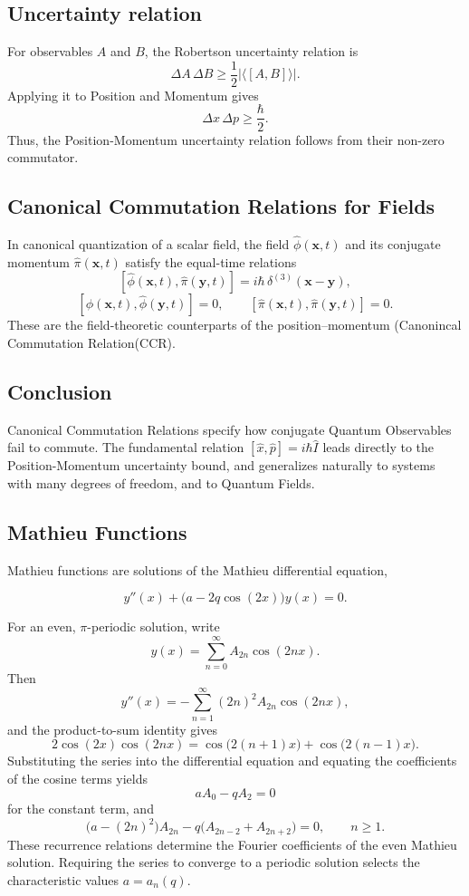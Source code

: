 \documentclass[a4paper, 10pt, onepage]{elegantbook}
\begin{document}
\subsection{Uncertainty relation}

For observables \(A\) and \(B\), the Robertson uncertainty relation is
\[
\Delta A\,\Delta B
\geq \frac{1}{2}\left|\langle[A,B]\rangle\right|.
\]
Applying it to Position and Momentum gives
\[
\Delta x\,\Delta p\geq\frac{\hbar}{2}.
\]
Thus, the Position-Momentum uncertainty relation follows from their non-zero commutator.

\subsection{Canonical Commutation Relations for Fields}

In canonical quantization of a scalar field, the field
\(\hat{\phi}(\mathbf{x},t)\) and its conjugate momentum
\(\hat{\pi}(\mathbf{x},t)\) satisfy the equal-time relations
\[
[\hat{\phi}(\mathbf{x},t),\hat{\pi}(\mathbf{y},t)]
=i\hbar\,\delta^{(3)}(\mathbf{x}-\mathbf{y}),
\]
\[
[\hat{\phi}(\mathbf{x},t),\hat{\phi}(\mathbf{y},t)]=0,
\qquad
[\hat{\pi}(\mathbf{x},t),\hat{\pi}(\mathbf{y},t)]=0.
\]
These are the field-theoretic counterparts of the position--momentum (Canonincal Commutation Relation(CCR).

\subsection{Conclusion}

Canonical Commutation Relations specify how conjugate Quantum Observables fail to commute. The fundamental relation
\([\hat{x},\hat{p}]=i\hbar\hat{I}\) leads directly to the Position-Momentum uncertainty bound, and generalizes naturally to systems with many degrees of freedom, and to Quantum Fields.

\subsection{Mathieu Functions}

Mathieu functions are solutions of the Mathieu differential equation,

\[
y''(x) + \bigl(a - 2q\cos(2x)\bigr)y(x) = 0.
\]

For an even, \(\pi\)-periodic solution, write
\[
y(x) = \sum_{n=0}^{\infty} A_{2n}\cos(2nx).
\]
Then
\[
y''(x) = -\sum_{n=1}^{\infty}(2n)^2A_{2n}\cos(2nx),
\]
and the product-to-sum identity gives
\[
2\cos(2x)\cos(2nx)
= \cos\bigl(2(n+1)x\bigr)+\cos\bigl(2(n-1)x\bigr).
\]
Substituting the series into the differential equation and equating
the coefficients of the cosine terms yields
\[
aA_0-qA_2=0
\]
for the constant term, and
\[
\bigl(a-(2n)^2\bigr)A_{2n}
-q\bigl(A_{2n-2}+A_{2n+2}\bigr)=0,
\qquad n\geq 1.
\]
These recurrence relations determine the Fourier coefficients of the
even Mathieu solution. Requiring the series to converge to a periodic
solution selects the characteristic values \(a=a_n(q)\).
\end{document}
